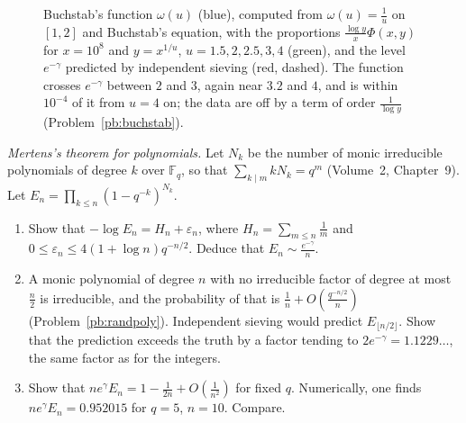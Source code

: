 \begin{figure}[ht]
\centering
{}
\caption{Buchstab's function $\omega(u)$ (blue), computed from $\omega(u)=\frac1u$ on $[1,2]$ and Buchstab's equation, with the proportions $\frac{\log y}x\Phi(x,y)$ for
$x=10^8$ and $y=x^{1/u}$, $u=1.5,2,2.5,3,4$ (green), and the level $e^{-\gamma}$ predicted by independent sieving (red, dashed). The function crosses $e^{-\gamma}$
between $2$ and $3$, again near $3.2$ and $4$, and is within $10^{-4}$ of it from $u=4$ on; the data are off by a term of order $\frac1{\log y}$ (Problem~\ref{pb:buchstab}).}
\label{fig:buchstab}
\end{figure}

\begin{exercise}[$\star\star$]\label{pb:polymertens}
\emph{Mertens's theorem for polynomials.} Let $N_k$ be the number of monic irreducible polynomials of degree $k$ over $\mathbb F_q$, so that
$\sum_{k\mid m}kN_k=q^m$ (Volume~2, Chapter~9). Let $E_n=\prod_{k\le n}(1-q^{-k})^{N_k}$.
\begin{enumerate}[label=(\alph*)]
\item Show that $-\log E_n=H_n+\varepsilon_n$, where $H_n=\sum_{m\le n}\frac1m$ and $0\le\varepsilon_n\le4(1+\log n)q^{-n/2}$. Deduce that $E_n\sim\frac{e^{-\gamma}}n$.
\item A monic polynomial of degree $n$ with no irreducible factor of degree at most $\frac n2$ is irreducible, and the probability of that is $\frac1n+O(\frac{q^{-n/2}}n)$
(Problem~\ref{pb:randpoly}). Independent sieving would predict $E_{\lfloor n/2\rfloor}$. Show that the prediction exceeds the truth by a factor tending to $2e^{-\gamma}=1.1229\ldots$, the same factor as for the integers.
\item Show that $ne^\gamma E_n=1-\frac1{2n}+O(\frac1{n^2})$ for fixed $q$. Numerically, one finds $ne^\gamma E_n=0.952015$ for $q=5$, $n=10$. Compare.
\end{enumerate}
\end{exercise}

